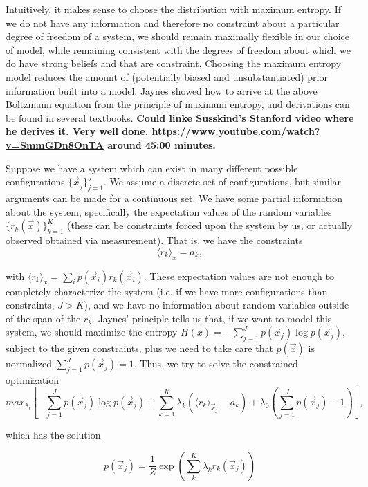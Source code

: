 \documentclass[nofootinbib, superscriptaddress, prl]{revtex4}
\begin{document}
Intuitively, it makes sense to choose the distribution with maximum entropy. If we do not have any information and therefore no constraint about a particular degree of freedom of a system, we should remain maximally flexible in our choice of model, while remaining consistent with the degrees of freedom about which we do have strong beliefs and that are constraint. Choosing the maximum entropy model reduces the amount of (potentially biased and unsubstantiated) prior information built into a model. Jaynes showed how to arrive at the above Boltzmann equation from the principle of maximum entropy, and derivations can be found in several textbooks. \textbf{Could linke Susskind's Stanford video where he derives it. Very well done. \url{https://www.youtube.com/watch?v=SmmGDn8OnTA} around 45:00 minutes.}

Suppose we have a system which can exist in many different possible configurations $\{\vec{x}_j\}_{j=1}^J$. We assume a discrete set of configurations, but similar arguments can be made for a continuous set. We have some partial information about the system, specifically the expectation values of the random variables $\{r_k(\vec{x})\}_{k=1}^K$ (these can be constraints forced upon the system by us, or actually observed obtained via measurement). That is, we have the constraints 
\begin{equation}
 \langle r_k \rangle_{x} = a_k,
\end{equation}

with $ \langle r_k \rangle_{x} = \sum_i p(\vec{x}_i) r_k(\vec{x}_i)$.
These expectation values are not enough to completely characterize the system (i.e. if we have more configurations than constraints, $J>K$), and we have no information about random variables outside of the span of the $r_k$. Jaynes' principle tells us that, if we want to model this system, we should maximize the entropy $H(x) = -\sum_{j=1}^J p(\vec{x}_j) \log p(\vec{x}_j)$, subject to the given constraints, plus we need to take care that $p(\vec{x})$ is normalized $\sum_{j=1}^J p(\vec{x}_j) = 1 $. Thus, we try to solve the constrained optimization
\begin{equation}
 \textit{max}_{\lambda_i}[-\sum_{j=1}^J p(\vec{x}_j) \log p(\vec{x}_j) + \sum_{k=1}^K \lambda_k (\langle r_k \rangle_{\vec{x}_j} - a_k) + \lambda_0(\sum_{j=1}^J p(\vec{x}_j) - 1)],
\end{equation}

which has the solution

\begin{equation}
p(\vec{x}_j) = \frac{1}{Z} \exp \left( \sum_k^K \lambda_k  r_k (\vec{x}_j)\right)
\end{equation}
\end{document}
